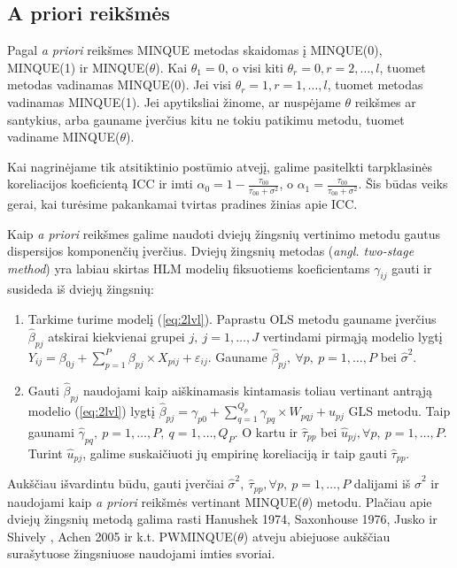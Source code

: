 \documentclass[11pt,a4paper]{article}
\begin{document}
\subsection{A priori reikšmės}\label{subsec:apriori}
\indent Pagal \textit{a priori} reikšmes MINQUE metodas skaidomas į MINQUE(0), MINQUE(1) ir MINQUE($\theta$). Kai $\theta_1=0$, o visi kiti $\theta_r=0, r = 2,\dots,l$, tuomet metodas vadinamas MINQUE(0). Jei visi $\theta_r=1, r=1,\dots,l$, tuomet metodas vadinamas MINQUE(1). Jei apytiksliai žinome, ar nuspėjame $\theta$ reikšmes ar santykius, arba gauname įverčius kitu ne tokiu patikimu metodu, tuomet vadiname MINQUE($\theta$).

\indent Kai nagrinėjame tik atsitiktinio postūmio atvejį, galime pasitelkti tarpklasinės koreliacijos koeficientą ICC ir imti $\alpha_0=1-\frac{\tau_{00}}{\tau_{00}+\sigma^2}$, o $\alpha_1=\frac{\tau_{00}}{\tau_{00}+\sigma^2}$. Šis būdas veiks gerai, kai turėsime pakankamai tvirtas pradines žinias apie ICC\cite{delpish}.

\indent Kaip \textit{a priori} reikšmes galime naudoti dviejų žingsnių vertinimo metodu gautus dispersijos komponenčių įverčius. Dviejų žingsnių metodas (\textit{angl. two-stage method}) yra labiau skirtas HLM modelių fiksuotiems koeficientams $\gamma_{ij}$ gauti ir susideda iš dviejų žingsnių:
\begin{enumerate}
\item Tarkime turime modelį (\ref{eq:2lvl}). Paprastu OLS metodu gauname įverčius $\hat{\beta}_{pj}$ atskirai kiekvienai grupei $j,\ j=1,\dots,J$ vertindami pirmąją modelio lygtį $Y_{ij} = \beta_{0j}+\sum^P_{p = 1} \beta_{pj}\times X_{pij}+\varepsilon_{ij}$. Gauname $\hat{\beta}_{pj}, \ \forall p,\ p=1,\dots,P$ bei $\hat{\sigma}^2$.
\item Gauti $\hat{\beta}_{pj}$ naudojami kaip aiškinamasis kintamasis toliau vertinant antrąją modelio (\ref{eq:2lvl}) lygtį $\hat{\beta}_{pj} = \gamma_{p0} + \sum^{Q_p}_{q=1}\gamma_{pq}\times W_{pqj}+u_{pj}$ GLS metodu. Taip gaunami $\hat{\gamma}_{pq}, \ p=1,\dots,P,\  q=1,\dots,Q_P$. O kartu ir $\hat{\tau}_{pp}$ bei $\hat{u}_{pj}, \forall p,\ p=1,\dots,P$. Turint $\hat{u}_{pj}$, galime suskaičiuoti jų empirinę koreliaciją ir taip gauti $\hat{\tau}_{pp}$.
\end{enumerate}

\indent Aukščiau išvardintu būdu, gauti įverčiai $\hat{\sigma}^2,\ \hat{\tau}_{pp}, \forall p,\ p=1,\dots,P$ dalijami iš $\hat{\sigma}^2$ ir naudojami kaip \textit{a priori} reikšmės vertinant MINQUE($\theta$) metodu. Plačiau apie dviejų žingsnių metodą galima rasti Hanushek 1974\cite{hanushek}, Saxonhouse 1976\cite{saxonhouse}, Jusko ir Shively \cite{jusko},  Achen 2005\cite{achen} ir k.t. PWMINQUE($\theta$) atveju abiejuose aukščiau surašytuose žingsniuose naudojami imties svoriai.
\end{document}
